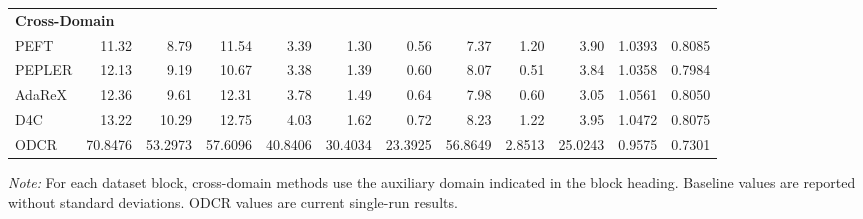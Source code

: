 \begin{table}[t]
{\begin{tabular}{lrrrrrrrrrrr}
\midrule
\multicolumn{12}{l}{\textbf{Cross-Domain}} \\
PEFT & 11.32 & 8.79 & 11.54 & 3.39 & 1.30 & 0.56 & 7.37 & 1.20 & 3.90 & 1.0393 & 0.8085 \\
PEPLER & 12.13 & 9.19 & 10.67 & 3.38 & 1.39 & 0.60 & 8.07 & 0.51 & 3.84 & 1.0358 & 0.7984 \\
AdaReX & 12.36 & 9.61 & 12.31 & 3.78 & 1.49 & 0.64 & 7.98 & 0.60 & 3.05 & 1.0561 & 0.8050 \\
D4C & 13.22 & 10.29 & 12.75 & 4.03 & 1.62 & 0.72 & 8.23 & 1.22 & 3.95 & 1.0472 & 0.8075 \\
ODCR & 70.8476 & 53.2973 & 57.6096 & 40.8406 & 30.4034 & 23.3925 & 56.8649 & 2.8513 & 25.0243 & 0.9575 & 0.7301 \\
\bottomrule
\end{tabular}%
}
\vspace{2pt}
\parbox{\textwidth}{\scriptsize \textit{Note:} For each dataset block, cross-domain methods use the auxiliary domain indicated in the block heading. Baseline values are reported without standard deviations. ODCR values are current single-run results.}
\label{tab:overall_performance_cross_platform}
\end{table}
